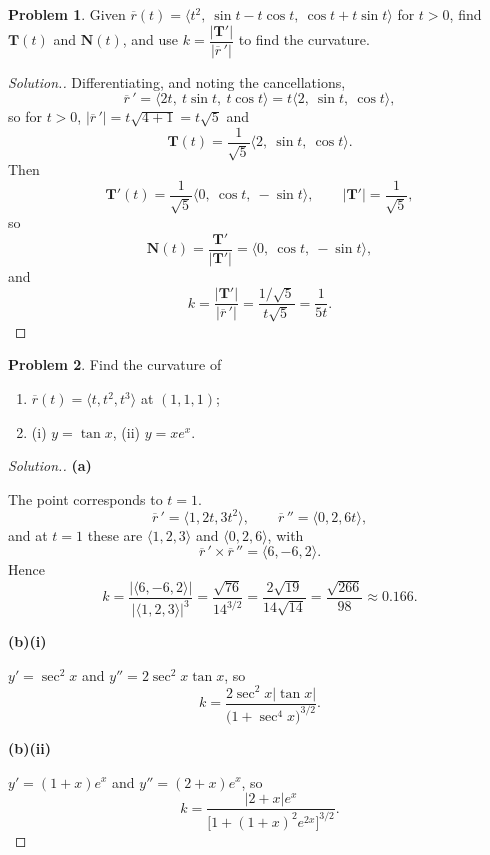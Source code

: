 \documentclass[11pt,a4paper]{article}
\theoremstyle{definition}
\newtheorem{problemx}{Problem}[subsection]
\newenvironment{problem}{\begin{problemx}}{\end{problemx}}
\newenvironment{solution}
  {\renewcommand{\qedsymbol}{}\begin{proof}[\textit{Solution}.]}
  {\end{proof}}
\newcommand{\subhead}[1]{%
  \par\medskip\noindent\textbf{#1}\par\nobreak\smallskip}
\begin{document}
\begin{problem}
Given $\overline{r}(t) = \langle t^2,\ \sin t - t\cos t,\ \cos t + t\sin t\rangle$
for $t>0$, find $\textbf{T}(t)$ and $\textbf{N}(t)$, and use
$k = \dfrac{\left|\textbf{T}'\right|}{\left|\overline{r}\,'\right|}$ to find the
curvature.
\end{problem}
\begin{solution}
Differentiating, and noting the cancellations,
$$\overline{r}\,' = \langle 2t,\ t\sin t,\ t\cos t\rangle
= t\langle 2,\ \sin t,\ \cos t\rangle ,$$
so for $t>0$, $\left|\overline{r}\,'\right| = t\sqrt{4+1} = t\sqrt5$ and
$$\textbf{T}(t) = \frac{1}{\sqrt5}\langle 2,\ \sin t,\ \cos t\rangle .$$
Then
$$\textbf{T}'(t) = \frac{1}{\sqrt5}\langle 0,\ \cos t,\ -\sin t\rangle,
\qquad \left|\textbf{T}'\right| = \frac{1}{\sqrt5},$$
so
$$\textbf{N}(t) = \frac{\textbf{T}'}{\left|\textbf{T}'\right|}
= \langle 0,\ \cos t,\ -\sin t\rangle ,$$
and
$$k = \frac{\left|\textbf{T}'\right|}{\left|\overline{r}\,'\right|}
= \frac{1/\sqrt5}{t\sqrt5} = \frac{1}{5t}.$$
\end{solution}

\begin{problem}
Find the curvature of
\begin{enumerate}
\item[(a)] $\overline{r}(t) = \langle t, t^2, t^3\rangle$ at $(1,1,1)$;
\item[(b)] (i) $y = \tan x$, \quad (ii) $y = xe^x$.
\end{enumerate}
\end{problem}
\begin{solution}
\subhead{(a)}
The point corresponds to $t=1$.
$$\overline{r}\,' = \langle 1,2t,3t^2\rangle,\qquad
\overline{r}\,'' = \langle 0,2,6t\rangle ,$$
and at $t=1$ these are $\langle 1,2,3\rangle$ and $\langle 0,2,6\rangle$, with
$$\overline{r}\,'\times\overline{r}\,'' = \langle 6,-6,2\rangle .$$
Hence
$$k = \frac{\left|\langle 6,-6,2\rangle\right|}{\left|\langle 1,2,3\rangle\right|^3}
= \frac{\sqrt{76}}{14^{3/2}} = \frac{2\sqrt{19}}{14\sqrt{14}}
= \frac{\sqrt{266}}{98}\approx 0.166 .$$

\subhead{(b)(i)}
$y' = \sec^2x$ and $y'' = 2\sec^2x\tan x$, so
$$k = \frac{2\sec^2x\left|\tan x\right|}{\big(1+\sec^4x\big)^{3/2}} .$$

\subhead{(b)(ii)}
$y' = (1+x)e^x$ and $y'' = (2+x)e^x$, so
$$k = \frac{\left|2+x\right|e^x}{\Big[1+(1+x)^2e^{2x}\Big]^{3/2}} .$$
\end{solution}
\end{document}
